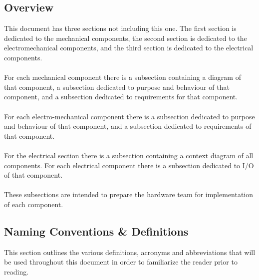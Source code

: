 \documentclass[titlepage]{article}
\begin{document}
\subsection{Overview}
This document has three sections not including this one. The first section is dedicated to the mechanical components, the second section is dedicated to the electromechanical components, and the third section is dedicated to the electrical components.\\\\
For each mechanical component there is a subsection containing a diagram of that component, a subsection dedicated to purpose and behaviour of that component, and a subsection dedicated to requirements for that component.\\\\
For each electro-mechanical component there is a subsection dedicated to purpose and behaviour of that component, and a subsection dedicated to requirements of that component.\\\\
For the electrical section there is a subsection containing a context diagram of all components. For each electrical component there is a subsection dedicated to I/O of that component.\\\\
These subsections are intended to prepare the hardware team for implementation of each component.

\subsection{Naming Conventions \& Definitions}
This section outlines the various definitions, acronyms and abbreviations that will be used throughout this document in order to familiarize the reader prior to reading.
\end{document}
